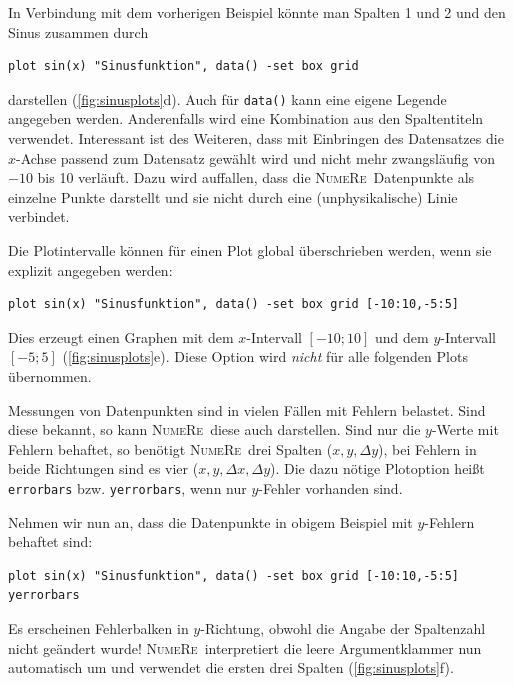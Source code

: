 \documentclass[DIV=14,headsepline,footsepline]{scrbook}
\newcommand{\NR}{\textsc{Nu\-me\-Re}}
\begin{document}
				In Verbindung mit dem vorherigen Beispiel könnte man Spalten 1 und 2 und den Sinus zusammen durch
				\begin{lstlisting}
plot sin(x) "Sinusfunktion", data() -set box grid
				\end{lstlisting}
				darstellen (\autoref{fig:sinusplots}d). Auch für \lstinline+data()+ kann eine eigene Legende angegeben werden. Anderenfalls wird eine Kombination aus den Spaltentiteln verwendet. Interessant ist des Weiteren, dass mit Einbringen des Datensatzes die $x$-Achse passend zum Datensatz gewählt wird und nicht mehr zwangsläufig von $-10$ bis 10 verläuft. Dazu wird auffallen, dass die \NR\ Datenpunkte als einzelne Punkte darstellt und sie nicht durch eine (unphysikalische) Linie verbindet.
				
				Die Plotintervalle können für einen Plot global überschrieben werden, wenn sie explizit angegeben werden:
				\begin{lstlisting}
plot sin(x) "Sinusfunktion", data() -set box grid [-10:10,-5:5]
				\end{lstlisting}
				Dies erzeugt einen Graphen mit dem $x$-Intervall $[-10;10]$ und dem $y$-Intervall $[-5;5]$ (\autoref{fig:sinusplots}e). Diese Option wird \emph{nicht} für alle folgenden Plots übernommen.
				
				Messungen von Datenpunkten sind in vielen Fällen mit Fehlern belastet. Sind diese bekannt, so kann \NR\ diese auch darstellen. Sind nur die $y$-Werte mit Fehlern behaftet, so benötigt \NR\ drei Spalten ($x,y,\Delta y$), bei Fehlern in beide Richtungen sind es vier ($x,y,\Delta x, \Delta y$). Die dazu nötige Plotoption heißt \lstinline+errorbars+ bzw. \lstinline+yerrorbars+, wenn nur $y$-Fehler vorhanden sind.
				
				Nehmen wir nun an, dass die Datenpunkte in obigem Beispiel mit $y$-Fehlern behaftet sind:
				\begin{lstlisting}
plot sin(x) "Sinusfunktion", data() -set box grid [-10:10,-5:5] yerrorbars
				\end{lstlisting}
				Es erscheinen Fehlerbalken in $y$-Richtung, obwohl die Angabe der Spaltenzahl nicht geändert wurde! \NR\ interpretiert die leere Argumentklammer nun automatisch um und verwendet die ersten drei Spalten (\autoref{fig:sinusplots}f).
				
\end{document}
